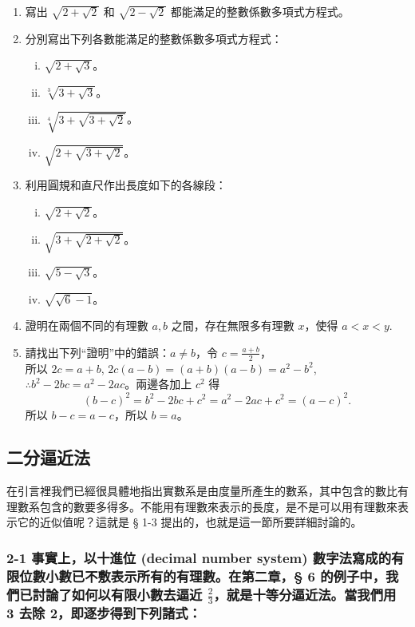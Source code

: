 \begin{enumerate}
    \item 寫出 $\sqrt{2+\sqrt{2}}$ 和 $\sqrt{2-\sqrt{2}}$ 都能滿足的整數係數多項式方程式。
    \item 分別寫出下列各數能滿足的整數係數多項式方程式：
    \begin{enumerate}[(i)]
        \item $\sqrt{2+\sqrt{3}}$。
        \item $\sqrt[3]{3+\sqrt{3}}$。
        \item $\sqrt[4]{3+\sqrt{3+\sqrt{2}}}$。
        \item $\sqrt{2+\sqrt{3+\sqrt{2}}}$。
    \end{enumerate}
    \item 利用圓規和直尺作出長度如下的各線段：
    \begin{enumerate}[(i)]
        \item $\sqrt{2+\sqrt{2}}$。
        \item $\sqrt{3+\sqrt{2+\sqrt{2}}}$。
        \item $\sqrt{5-\sqrt{3}}$。
        \item $\sqrt{\sqrt{6}-1}$。
    \end{enumerate}
    \item 證明在兩個不同的有理數 $a, b$ 之間，存在無限多有理數 $x$，使得 $a < x < y$\label{note:b2-ch3-ex3-1-q4-xy}.
    \item 請找出下列“證明”中的錯誤：$a \neq b$，令 $c = \frac{a+b}{2}$，\\
    所以 $2c = a+b$, $2c(a-b) = (a+b)(a-b) = a^2-b^2$,\\
    $\therefore b^2-2bc = a^2-2ac$。兩邊各加上 $c^2$ 得
    \[
    (b-c)^2 = b^2-2bc+c^2 = a^2-2ac+c^2 = (a-c)^2.
    \]
    所以 $b-c = a-c$，所以 $b=a$。
\end{enumerate}

\subsection{二分逼近法}\label{sec:b2_3-2}

在引言裡我們已經很具體地指出實數系是由度量所產生的數系，其中包含的數比有理數系包含的數要多得多。不能用有理數來表示的長度，是不是可以用有理數來表示它的近似值呢？這就是 § 1-3 提出的，也就是這一節所要詳細討論的。

\subsubsection*{2-1 事實上，以十進位 (decimal number system) 數字法寫成的有限位數小數已不敷表示所有的有理數。在第二章，§ 6 的例子中，我們已討論了如何以有限小數去逼近 $\frac{2}{3}$，就是十等分逼近法。當我們用 3 去除 2，即逐步得到下列諸式：}

